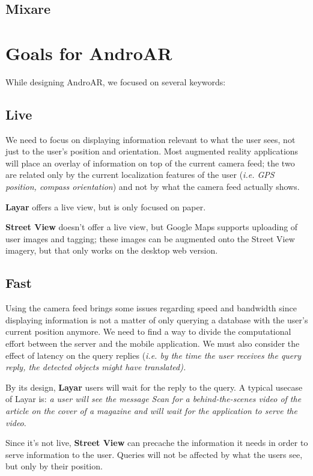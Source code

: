 \documentclass[a4paper,onecolumn,oneside,titlepage,12pt]{report}
\begin{document}
\section{Mixare}

\chapter{Goals for AndroAR}
While designing AndroAR, we focused on several keywords:
\section*{Live}
We need to focus on displaying information relevant to what the user sees, not just to the user's position and orientation. Most augmented reality applications will place an overlay of information on top of the current camera feed; the two are related only by the current localization features of the user (\emph{i.e. GPS position, compass orientation}) and not by what the camera feed actually shows.

\textbf{Layar} offers a live view, but is only focused on paper.

\textbf{Street View} doesn't offer a live view, but Google Maps supports uploading of user images and tagging; these images can be augmented onto the Street View imagery, but that only works on the desktop web version.
\section*{Fast}
Using the camera feed brings some issues regarding speed and bandwidth since displaying information is not a matter of only querying a database with the user's current position anymore. We need to find a way to divide the computational effort between the server and the mobile application. We must also consider the effect of latency on the query replies (\emph{i.e. by the time the user receives the query reply, the detected objects might have translated).}

By its design, \textbf{Layar} users will wait for the reply to the query. A typical usecase of Layar is: \emph{a user will see the message \emph{Scan for a behind-the-scenes video of the article} on the cover of a magazine and will wait for the application to serve the video}.

Since it's not live, \textbf{Street View} can precache the information it needs in order to serve information to the user. Queries will not be affected by what the users see, but only by their position.
\end{document}
